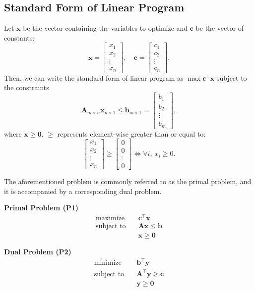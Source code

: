 \documentclass[twoside]{article}
\begin{document}
\subsection{Standard Form of Linear Program}
Let $\mathbf{x}$ be the vector containing the variables to optimize and $\mathbf{c}$
be the vector of constants: \[
    \mathbf{x} = \begin{bmatrix} x_1 \\ x_2 \\ \vdots \\ x_n \end{bmatrix},
    \quad
    \mathbf{c} = \begin{bmatrix} c_1 \\ c_2 \\ \vdots \\ c_n \end{bmatrix}.
\] Then, we can write the standard form of linear program as
$\max \mathbf{c}^\top \mathbf{x}$ subject to the constraints \[
    \mathbf{A}_{m \times n} \mathbf{x}_{n \times 1}
        \leq \mathbf{b}_{m \times 1}
        = \begin{bmatrix} b_1 \\ b_2 \\ \vdots \\ b_m \end{bmatrix},
\]
where $\mathbf{x} \geq \mathbf{0}.$ $\geq$ represents element-wise greater than or
equal to: \[
    \begin{bmatrix} x_1 \\ x_2 \\ \vdots \\ x_n \end{bmatrix}
        \geq \begin{bmatrix} 0 \\ 0 \\ \vdots \\ 0 \end{bmatrix}
    \iff \forall i,\ x_i \geq 0.
\]

The aforementioned problem is commonly referred to as the primal problem, and it
is accompanied by a corresponding dual problem.\\

\begin{minipage}[t]{0.45\textwidth}
  \centering
  \textbf{Primal Problem (P1)}
  \begin{align*}
    \text{maximize} \quad & \mathbf{c}^\top \mathbf{x} \\
    \text{subject to} \quad & \mathbf{Ax} \leq \mathbf{b} \\
    & \mathbf{x} \geq \mathbf{0}
  \end{align*}
\end{minipage}
\hfill
\begin{minipage}[t]{0.45\textwidth}
  \centering
  \textbf{Dual Problem (P2)}
  \begin{align*}
    \text{minimize} \quad & \mathbf{b}^\top \mathbf{y} \\
    \text{subject to} \quad & \mathbf{A}^\top \mathbf{y} \geq \mathbf{c} \\
    & \mathbf{y} \geq \mathbf{0}
  \end{align*}
\end{minipage}
\end{document}
